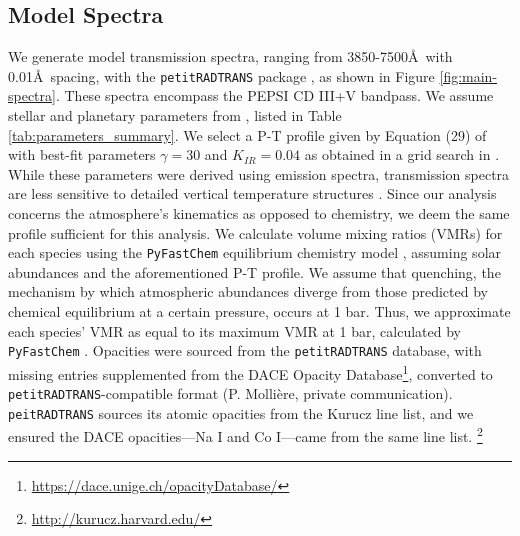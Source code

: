 \documentclass[twocolumn]{aastex631}
\newcommand{\code}[1]{\texttt{#1}}
\begin{document}
    \subsection{Model Spectra} \label{subsec:Model Spectra}
        We generate model transmission spectra, ranging from 3850-7500\AA\ with 0.01\AA\ spacing, with the \code{petitRADTRANS} package \citep{petitRADTRANS}, as shown in Figure \ref{fig:main-spectra}. These spectra encompass the PEPSI CD III+V bandpass. We assume stellar and planetary parameters from \cite{Lund2017}, listed in Table \ref{tab:parameters_summary}. We select a P-T profile given by Equation (29) of \cite{Guillot2010} with best-fit parameters $\gamma = 30$ and $K_{IR} = 0.04$ as obtained in a grid search in \cite{Johnson2023}. While these parameters were derived using emission spectra, transmission spectra are less sensitive to detailed vertical temperature structures \citep{Kesseli2020}. Since our analysis concerns the atmosphere's kinematics as opposed to chemistry, we deem the same profile sufficient for this analysis. 
        We calculate volume mixing ratios (VMRs) for each species using the \code{PyFastChem} equilibrium chemistry model \citep{Stock2018, Stock2022, Kitzmann2023}, assuming solar abundances \citep{Asplund2021} and the aforementioned P-T profile. We assume that quenching, the mechanism by which atmospheric abundances diverge from those predicted by chemical equilibrium at a certain pressure, occurs at 1 bar. Thus, we approximate each species' VMR as equal to its maximum VMR at 1 bar, calculated by \code{PyFastChem} \citep {Johnson2023,Petz2023}. Opacities were sourced from the \code{petitRADTRANS} database, with missing entries supplemented from the DACE Opacity Database\footnote{\url{https://dace.unige.ch/opacityDatabase/}}, converted to \code{petitRADTRANS}-compatible format (P. Mollière, private communication). \code{peitRADTRANS} sources its atomic opacities from the Kurucz line list, and we ensured the DACE opacities---Na I and Co I---came from the same line list. \footnote{\url{http://kurucz.harvard.edu/}}
    
\end{document}
